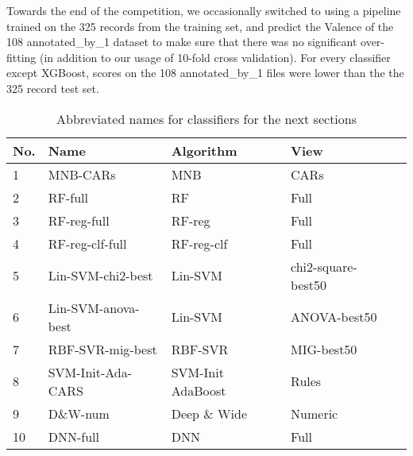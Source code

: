Towards the end of the competition, we occasionally switched to using a pipeline trained on the 325 records from the training set, and predict the \textsf{Valence} of the 108 \textsf{annotated\_by\_1} dataset to make sure that there was no significant over-fitting (in addition to our usage of 10-fold cross validation). For every classifier except \textsf{XGBoost}, scores on the 108 \textsf{annotated\_by\_1} files were lower than the the 325 record test set.

\begin{table}[]
    \centering
    \begin{tabular}{|l|l|l|l|l|}
    \hline
    \textsf{No.} & \textsf{Name} & \textsf{Algorithm} & \textsf{View} \\
    \hline
    1 & \textsf{MNB-CARs} & \textsf{MNB} & \textsf{CARs} \\
    2 & \textsf{RF-full} & \textsf{RF} & \textsf{Full} \\
    3 & \textsf{RF-reg-full} & \textsf{RF-reg} & \textsf{Full} \\
    4 & \textsf{RF-reg-clf-full} & \textsf{RF-reg-clf} & \textsf{Full} \\
    5 & \textsf{Lin-SVM-chi2-best} & \textsf{Lin-SVM} & \textsf{chi2-square-best50} \\
    6 & \textsf{Lin-SVM-anova-best} & \textsf{Lin-SVM} & \textsf{ANOVA-best50} \\
    7 & \textsf{RBF-SVR-mig-best} & \textsf{RBF-SVR} & \textsf{MIG-best50} \\
    8 & \textsf{SVM-Init-Ada-CARS} & \textsf{SVM-Init AdaBoost} & \textsf{Rules} \\
    9 & \textsf{D\&W-num} & \textsf{Deep \& Wide} & \textsf{Numeric} \\
    10 & \textsf{DNN-full} & \textsf{DNN} & \textsf{Full} \\
    \hline
    \end{tabular}
    \caption{Abbreviated names for classifiers for the next sections}
    \label{tab:Best6ClassifierNames}
    
\end{table}

